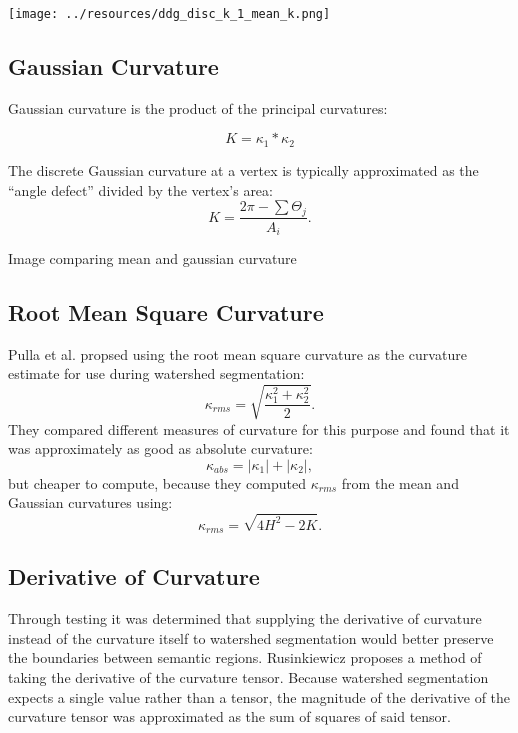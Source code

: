\texttt{[image: ../resources/ddg\_disc\_k\_1\_mean\_k.png]}

\subsection{Gaussian Curvature}\label{sec:gauss_k}
Gaussian curvature\cite{TheoremaEgregium} is the product of the principal curvatures:

\begin{equation}\label{eq:gauss_k}
	K = \kappa_1 * \kappa_2
\end{equation}

The discrete Gaussian curvature at a vertex is typically approximated as the ``angle defect'' divided by the vertex's area:
\begin{equation}
	K = \frac{2\pi - \sum \Theta_j}{A_i}.
\end{equation}

Image comparing mean and gaussian curvature

\subsection{Root Mean Square Curvature}
Pulla et al. propsed using the root mean square curvature as the curvature estimate for use during watershed segmentation:
\begin{equation}
	\kappa_{rms} = \sqrt{\frac{\kappa_1^2 + \kappa_2^2}{2}}.
\end{equation}
They compared different measures of curvature for this purpose and found that it was approximately as good as absolute curvature:
\begin{equation}
	\kappa_{abs} = |\kappa_1| + |\kappa_2|,
\end{equation}
but cheaper to compute, because they computed $\kappa_{rms}$ from the mean and Gaussian curvatures using:
\begin{equation}
	\kappa_{rms} = \sqrt{4H^2 - 2K}.
\end{equation}

\subsection{Derivative of Curvature}
Through testing it was determined that supplying the derivative of curvature instead of the curvature itself to watershed segmentation would better preserve the boundaries between semantic regions.
Rusinkiewicz proposes a method of taking the derivative of the curvature tensor\cite{SRTensor}.
Because watershed segmentation expects a single value rather than a tensor, the magnitude of the derivative of the curvature tensor was approximated as the sum of squares of said tensor.


